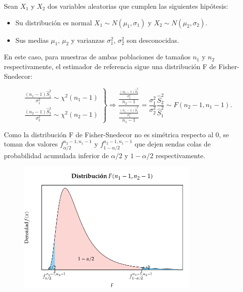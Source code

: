 \documentclass[
  a4paper,
]{scrreport}
\providecommand{\tightlist}{%
  \setlength{\itemsep}{0pt}\setlength{\parskip}{0pt}}\usepackage{longtable,booktabs,array}
\theoremstyle{definition}
\theoremstyle{definition}
\theoremstyle{plain}
\theoremstyle{remark}
\begin{document}
Sean \(X_1\) y \(X_2\) dos variables aleatorias que cumplen las
siguientes hipótesis:

\begin{itemize}
\tightlist
\item
  Su distribución es normal \(X_1\sim N(\mu_1,\sigma_1)\) y
  \(X_2\sim N(\mu_2,\sigma_2)\).
\item
  Sus medias \(\mu_1\), \(\mu_2\) y varianzas \(\sigma_1^2\),
  \(\sigma_2^2\) son desconocidas.
\end{itemize}

En este caso, para muestras de ambas poblaciones de tamaños \(n_1\) y
\(n_2\) respectivamente, el estimador de referencia sigue una
distribución F de Fisher-Snedecor:

\[
\left.
\begin{array}{l}
\displaystyle \frac{(n_1-1)\hat{S}_1^2}{\sigma_1^2}\sim \chi^2(n_1-1) \\
\displaystyle \frac{(n_2-1)\hat{S}_2^2}{\sigma_2^2}\sim \chi^2(n_2-1)
\end{array}
\right\}
\Rightarrow
\frac{\frac{\frac{(n_2-1)\hat{S}_2^2}{\sigma_2^2}}{n_2-1}}{\frac{\frac{(n_1-1)\hat{S}_1^2}{\sigma_1^2}}{n_1-1}} =
\frac{\sigma_1^2}{\sigma_2^2}\frac{\hat{S}_2^2}{\hat{S}_1^2}\sim F(n_2-1,n_1-1).
\]

Como la distribución F de Fisher-Snedecor no es simétrica respecto al 0,
se toman dos valores \(f^{n_2-1,n_1-1}_{\alpha/2}\) y
\(f^{n_2-1,n_1-1}_{1-\alpha/2}\) que dejen sendas colas de probabilidad
acumulada inferior de \(\alpha/2\) y \(1-\alpha/2\) respectivamente.

\begin{figure}

{\centering \includegraphics[width=0.8\textwidth,height=\textheight]{img/estimacion/extremos-intervalo-comparacion-varianzas-normal.pdf}

}

\end{figure}
\end{document}
